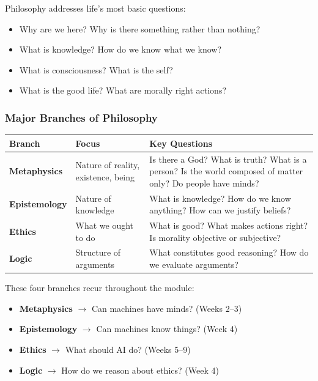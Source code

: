Philosophy addresses life's most basic questions:
\begin{itemize}
  \item Why are we here? Why is there something rather than nothing?
  \item What is knowledge? How do we know what we know?
  \item What is consciousness? What is the self?
  \item What is the good life? What are morally right actions?
\end{itemize}

\bigseparator

\subsubsection{Major Branches of Philosophy}

\begin{center}
\renewcommand{\arraystretch}{1.4}
\begin{tabular}{@{} l p{5cm} p{5cm} @{}}
\toprule
\textbf{Branch} & \textbf{Focus} & \textbf{Key Questions} \\
\midrule
\textbf{Metaphysics} & Nature of reality, existence, being & Is there a God? What is truth? What is a person? Is the world composed of matter only? Do people have minds? \\
\textbf{Epistemology} & Nature of knowledge & What is knowledge? How do we know anything? How can we justify beliefs? \\
\textbf{Ethics} & What we ought to do & What is good? What makes actions right? Is morality objective or subjective? \\
\textbf{Logic} & Structure of arguments & What constitutes good reasoning? How do we evaluate arguments? \\
\bottomrule
\end{tabular}
\end{center}

\begin{tipbox}
These four branches recur throughout the module:
\begin{itemize}
  \item \textbf{Metaphysics} $\to$ Can machines have minds? (Weeks 2--3)
  \item \textbf{Epistemology} $\to$ Can machines know things? (Week 4)
  \item \textbf{Ethics} $\to$ What should AI do? (Weeks 5--9)
  \item \textbf{Logic} $\to$ How do we reason about ethics? (Week 4)
\end{itemize}
\end{tipbox}

